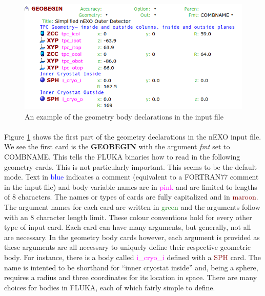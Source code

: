 \documentclass[10pt]{article}
\begin{document}
\begin{figure}[h]
    \begin{center}
    \includegraphics[scale=0.5]{figures/geometry_1.png}
    \caption{An example of the geometry body declarations in the input file}
    \label{fig:geometry1}
    \end{center}
\end{figure}

\paragraph{}
Figure \ref{fig:geometry1} shows the first part of the geometry declarations in the nEXO input file. We see the first card is the \textbf{GEOBEGIN} with the argument \textit{fmt} set to COMBNAME. This tells the FLUKA binaries how to read in the following geometry cards. This is not particularly important. This seems to be the default mode. Text in \textcolor{blue}{blue} indicates a comment (equivalent to a FORTRAN77 comment in the input file) and body variable names are in \textcolor{magenta}{pink} and are limited to lengths of 8 characters. The names or types of cards are fully capitalized and in \textcolor{Maroon}{maroon}. The argument names for each card are written in \textcolor{ForestGreen}{green} and the arguments follow with an 8 character length limit. These colour conventions hold for every other type of input card. Each card can have many arguments, but generally, not all are necessary. In the geometry body cards however, each argument is provided as these arguments are all necessary to uniquely define their respective geometric body. For instance, there is a body called \textcolor{magenta}{i\_cryo\_i} defined with a \textcolor{Maroon}{SPH} card. The name is intented to be shorthand for ``inner cryostat inside'' and, being a sphere, requires a radius and three coordinates for its location in space. There are many choices for bodies in FLUKA, each of which fairly simple to define.
\end{document}
